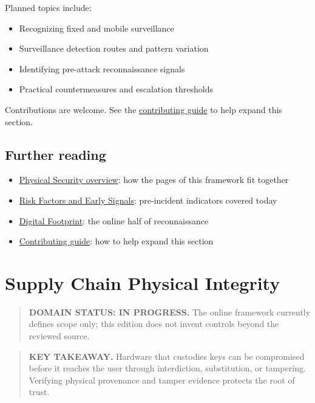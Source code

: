 Planned topics include:

\begin{itemize}
\tightlist
\item
  Recognizing fixed and mobile surveillance
\item
  Surveillance detection routes and pattern variation
\item
  Identifying pre-attack reconnaissance signals
\item
  Practical countermeasures and escalation thresholds
\end{itemize}

Contributions are welcome. See the \href{https://frameworks.securityalliance.dev/contribute/contributing}{contributing guide} to help expand this section.

\section{Further reading}\label{further-reading-6}

\begin{itemize}
\tightlist
\item
  \href{https://frameworks.securityalliance.dev/physical-security/overview}{Physical Security overview}: how the pages of this framework fit together
\item
  \href{https://frameworks.securityalliance.dev/physical-security/coercion-and-duress/risk-factors-and-early-signals}{Risk Factors and Early Signals}: pre-incident indicators covered today
\item
  \href{https://frameworks.securityalliance.dev/privacy/digital-footprint}{Digital Footprint}: the online half of reconnaissance
\item
  \href{https://frameworks.securityalliance.dev/contribute/contributing}{Contributing guide}: how to help expand this section
\end{itemize}

\chapter{Supply Chain Physical Integrity}\label{supply-chain-physical-integrity}

\begin{quote}
\textbf{DOMAIN STATUS: IN PROGRESS.} The online framework currently defines scope only; this edition does not invent controls beyond the reviewed source.
\end{quote}

\begin{quote}
\textbf{KEY TAKEAWAY.} Hardware that custodies keys can be compromised before it reaches the user through interdiction, substitution, or tampering. Verifying physical provenance and tamper evidence protects the root of trust.
\end{quote}

